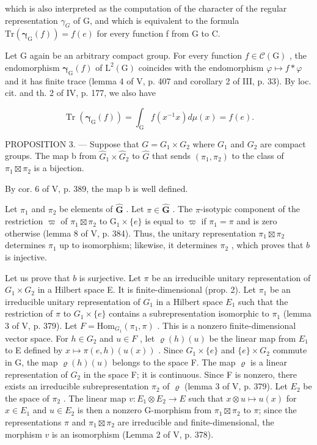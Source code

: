 which is also interpreted as the computation of the character of the regular representation \(\gamma_{G}\) of G, and which is equivalent to the formula \(\mathrm{Tr}(\boldsymbol{\gamma}_{\mathrm{G}}(f)) = f(e)\) for every function f from G to C.

Let G again be an arbitrary compact group. For every function \(f \in \mathcal{C}(\mathrm{G})\) , the endomorphism \(\boldsymbol{\gamma}_{\mathrm{G}}(f)\) of \(\mathrm{L}^{2}(\mathrm{G})\) coincides with the endomorphism \(\varphi \mapsto f * \varphi\) and it has finite trace (lemma 4 of V, p. 407 and corollary 2 of III, p. 33). By loc. cit. and th. 2 of IV, p. 177, we also have

\[
\operatorname{Tr} \left(\boldsymbol {\gamma} _ {\mathrm{G}} (f)\right) = \int_ {\mathrm{G}} f \left(x ^ {- 1} x\right) d \mu (x) = f (e).
\]

PROPOSITION 3. --- Suppose that \(G = G_{1} \times G_{2}\) where \(G_{1}\) and \(G_{2}\) are compact groups. The map b from \(\widehat{G}_{1} \times \widehat{G}_{2}\) to \(\widehat{G}\) that sends \((\pi_{1}, \pi_{2})\) to the class of \(\pi_{1} \boxtimes \pi_{2}\) is a bijection.

By cor. 6 of V, p. 389, the map b is well defined.

Let \(\pi_1\) and \(\pi_2\) be elements of \(\widehat{\mathbf{G}}\) . Let \(\pi \in \widehat{\mathbf{G}}\) . The \(\pi\)-isotypic component of the restriction \(\varpi\) of \(\pi_1 \boxtimes \pi_2\) to \(\mathrm{G}_1 \times \{e\}\) is equal to \(\varpi\) if \(\pi_1 = \pi\) and is zero otherwise (lemma 8 of V, p. 384). Thus, the unitary representation \(\pi_1 \boxtimes \pi_2\) determines \(\pi_1\) up to isomorphism; likewise, it determines \(\pi_2\) , which proves that \(b\) is injective.

Let us prove that \(b\) is surjective. Let \(\pi\) be an irreducible unitary representation of \(G_1 \times G_2\) in a Hilbert space E. It is finite-dimensional (prop. 2). Let \(\pi_1\) be an irreducible unitary representation of \(G_1\) in a Hilbert space \(E_1\) such that the restriction of \(\pi\) to \(G_1 \times \{e\}\) contains a subrepresentation isomorphic to \(\pi_1\) (lemma 3 of V, p. 379). Let \(F = \text{Hom}_{G_1}(\pi_1, \pi)\) . This is a nonzero finite-dimensional vector space. For \(h \in G_2\) and \(u \in F\) , let \(\varrho(h)(u)\) be the linear map from \(E_1\) to E defined by \(x \mapsto \pi(e, h)(u(x))\) . Since \(G_1 \times \{e\}\) and \(\{e\} \times G_2\) commute in G, the map \(\varrho(h)(u)\) belongs to the space F. The map \(\varrho\) is a linear representation of \(G_2\) in the space F; it is continuous. Since F is nonzero, there exists an irreducible subrepresentation \(\pi_2\) of \(\varrho\) (lemma 3 of V, p. 379). Let \(E_2\) be the space of \(\pi_2\) . The linear map \(v: E_1 \otimes E_2 \to E\) such that \(x \otimes u \mapsto u(x)\) for \(x \in E_1\) and \(u \in E_2\) is then a nonzero G-morphism from \(\pi_1 \boxtimes \pi_2\) to \(\pi\); since the representations \(\pi\) and \(\pi_1 \boxtimes \pi_2\) are irreducible and finite-dimensional, the morphism \(v\) is an isomorphism (Lemma 2 of V, p. 378).

